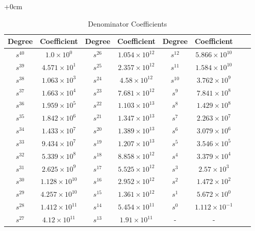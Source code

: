 \documentclass{article}
\begin{document}
\begin{table}[H]
  \centering
		\begin{adjustwidth}{+0cm}{}
		\caption{Denominator Coefficients}
		\begin{tabular}{|c|c|c|c|c|c|c|c|}
\hline
Degree & Coefficient & Degree & Coefficient & Degree & Coefficient\\
\hline
$s^{ 40 }$ & $ 1.0 \times 10^{ 0 }$ & $s^{ 26 }$ & $ 1.054 \times 10^{ 12 }$ & $s^{ 12 }$ & $ 5.866 \times 10^{ 10 }$  \\
\hline
$s^{ 39 }$ & $ 4.571 \times 10^{ 1 }$ & $s^{ 25 }$ & $ 2.357 \times 10^{ 12 }$ & $s^{ 11 }$ & $ 1.584 \times 10^{ 10 }$  \\
\hline
$s^{ 38 }$ & $ 1.063 \times 10^{ 3 }$ & $s^{ 24 }$ & $ 4.58 \times 10^{ 12 }$ & $s^{ 10 }$ & $ 3.762 \times 10^{ 9 }$  \\
\hline
$s^{ 37 }$ & $ 1.663 \times 10^{ 4 }$ & $s^{ 23 }$ & $ 7.681 \times 10^{ 12 }$ & $s^{ 9 }$ & $ 7.841 \times 10^{ 8 }$  \\
\hline
$s^{ 36 }$ & $ 1.959 \times 10^{ 5 }$ & $s^{ 22 }$ & $ 1.103 \times 10^{ 13 }$ & $s^{ 8 }$ & $ 1.429 \times 10^{ 8 }$  \\
\hline
$s^{ 35 }$ & $ 1.842 \times 10^{ 6 }$ & $s^{ 21 }$ & $ 1.347 \times 10^{ 13 }$ & $s^{ 7 }$ & $ 2.263 \times 10^{ 7 }$  \\
\hline
$s^{ 34 }$ & $ 1.433 \times 10^{ 7 }$ & $s^{ 20 }$ & $ 1.389 \times 10^{ 13 }$ & $s^{ 6 }$ & $ 3.079 \times 10^{ 6 }$  \\
\hline
$s^{ 33 }$ & $ 9.434 \times 10^{ 7 }$ & $s^{ 19 }$ & $ 1.207 \times 10^{ 13 }$ & $s^{ 5 }$ & $ 3.546 \times 10^{ 5 }$  \\
\hline
$s^{ 32 }$ & $ 5.339 \times 10^{ 8 }$ & $s^{ 18 }$ & $ 8.858 \times 10^{ 12 }$ & $s^{ 4 }$ & $ 3.379 \times 10^{ 4 }$  \\
\hline
$s^{ 31 }$ & $ 2.625 \times 10^{ 9 }$ & $s^{ 17 }$ & $ 5.525 \times 10^{ 12 }$ & $s^{ 3 }$ & $ 2.57 \times 10^{ 3 }$  \\
\hline
$s^{ 30 }$ & $ 1.128 \times 10^{ 10 }$ & $s^{ 16 }$ & $ 2.952 \times 10^{ 12 }$ & $s^{ 2 }$ & $ 1.472 \times 10^{ 2 }$  \\
\hline
$s^{ 29 }$ & $ 4.257 \times 10^{ 10 }$ & $s^{ 15 }$ & $ 1.361 \times 10^{ 12 }$ & $s^{ 1 }$ & $ 5.672 \times 10^{ 0 }$  \\
\hline
$s^{ 28 }$ & $ 1.412 \times 10^{ 11 }$ & $s^{ 14 }$ & $ 5.454 \times 10^{ 11 }$ & $s^{ 0 }$ & $ 1.112 \times 10^{ -1 }$  \\
\hline
$s^{ 27 }$ & $ 4.12 \times 10^{ 11 }$ & $s^{ 13 }$ & $ 1.91 \times 10^{ 11 }$ & - & -  \\
\hline
  	\end{tabular}
	\end{adjustwidth}
\end{table}
\end{document}
